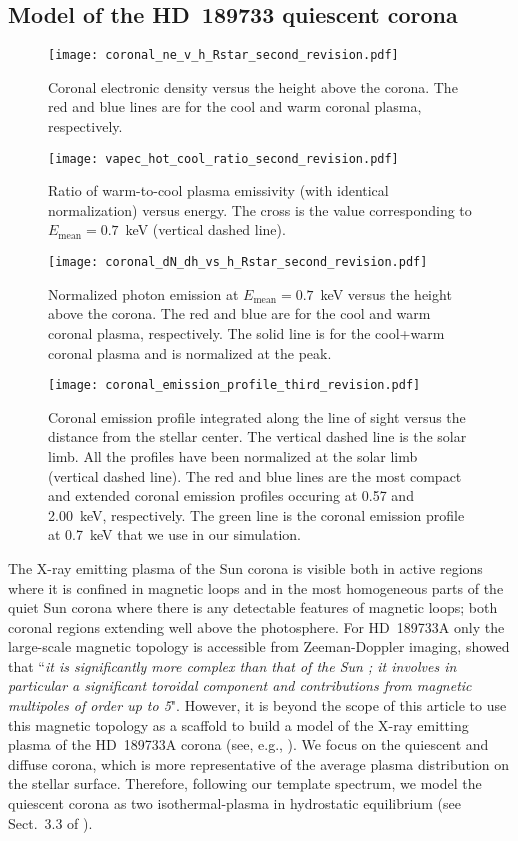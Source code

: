 \documentclass[iop]{emulateapj}
\begin{document}
\subsection{Model of the HD~189733 quiescent corona}
\label{Sect:corona}


\begin{figure}[!t]
  \centering
  \texttt{[image: coronal\_ne\_v\_h\_Rstar\_second\_revision.pdf]} 
  \caption{Coronal electronic density versus the height above the corona. 
    The red and blue lines are for the cool and warm coronal plasma, 
    respectively.}
  \label{Fig:coronal_ne}
  \medskip
  \texttt{[image: vapec\_hot\_cool\_ratio\_second\_revision.pdf]}
  \caption{Ratio of warm-to-cool plasma emissivity (with identical 
    normalization) versus energy. The cross is the value corresponding to 
    $E_\mathrm{mean}=0.7$~keV (vertical dashed line).}
  \label{Fig:vapec_ratio} 
  \medskip
  \texttt{[image: coronal\_dN\_dh\_vs\_h\_Rstar\_second\_revision.pdf]} 
  \caption{Normalized photon emission at $E_\mathrm{mean}=0.7$~keV versus 
    the height above the corona. The red and blue are for the 
    cool and warm coronal plasma, respectively. The solid line is for 
    the cool+warm coronal plasma and is normalized at the peak.}
  \label{Fig:coronal_dN_dh} 
  \medskip
  \texttt{[image: coronal\_emission\_profile\_third\_revision.pdf]} 
  \caption{Coronal emission profile integrated along the line of 
    sight versus the distance from the stellar center. The vertical dashed 
    line is the solar limb. All the profiles have been normalized at the solar
    limb (vertical dashed line). The red and blue lines are the most compact 
    and extended coronal emission profiles occuring at 0.57 and 2.00~keV, 
    respectively. The green line is the coronal emission profile at 0.7~keV 
    that we use in our simulation.}
  \label{Fig:coronal_emission_profile}
\end{figure}



The X-ray emitting plasma of the Sun corona is visible both in active regions where it is confined in magnetic loops
and in the most homogeneous parts of the quiet Sun corona where there is any detectable features of magnetic loops; both coronal 
regions extending well above the photosphere. For HD~189733A only the large-scale magnetic topology is accessible from Zeeman-Doppler 
imaging, \citet{Moutou2007} showed that ``{\it it is significantly more complex than that of the Sun ; it involves in particular a 
significant toroidal component and contributions from magnetic multipoles of order up to 5}". However, it is beyond the scope of 
this article to use this magnetic topology as a scaffold to build a model of the X-ray emitting plasma of the HD~189733A corona 
(see, e.g., \citealt{Jardine2006}). We focus on the quiescent and diffuse corona, which is more representative of the average plasma 
distribution on the stellar surface. Therefore, following our template spectrum, we model the quiescent corona as two isothermal-plasma 
in hydrostatic equilibrium (see Sect.\ 3.3 of \citealt{Aschwanden2004}). 
\end{document}
